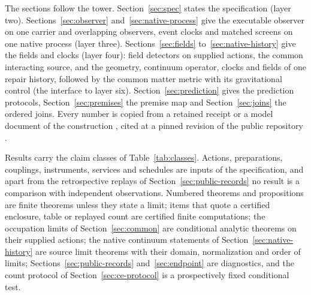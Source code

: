 \documentclass[11pt]{article}
\theoremstyle{definition}
\theoremstyle{remark}
\theoremstyle{plain}
\begin{document}
The sections follow the tower. Section~\ref{sec:spec} states the
specification (layer two). Sections~\ref{sec:observer}
and~\ref{sec:native-process} give the executable observer on one carrier and
overlapping observers, event clocks and matched screens on one native process
(layer three). Sections~\ref{sec:fields} to~\ref{sec:native-history} give the
fields and clocks (layer four): field detectors on supplied actions, the
common interacting source, and the geometry, continuum operator, clocks and
fields of one repair history, followed by the common matter metric with its
gravitational control (the interface to layer six).
Section~\ref{sec:prediction} gives the prediction protocols,
Section~\ref{sec:premises} the premise map and Section~\ref{sec:joins} the
ordered joins. Every number is copied from a
retained receipt or a model document of the construction \cite{mREADME},
cited at a pinned revision of the public repository \cite{ophrepo}.

Results carry the claim classes of Table~\ref{tab:classes}. Actions,
preparations, couplings, instruments, services and schedules are inputs of
the specification, and apart from the retrospective replays of
Section~\ref{sec:public-records} no result is a comparison with independent
observations. Numbered theorems and propositions are finite theorems unless
they state a limit; items that quote a certified enclosure, table or
replayed count are certified finite computations; the occupation limits of
Section~\ref{sec:common} are conditional analytic theorems on their supplied
actions; the native continuum statements of
Section~\ref{sec:native-history} are source limit theorems with their
domain, normalization and order of limits; Sections~\ref{sec:public-records}
and~\ref{sec:endpoint} are diagnostics, and the count protocol of
Section~\ref{sec:ce-protocol} is a prospectively fixed conditional test.
\end{document}
